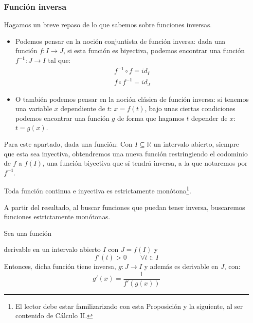 \subsubsection{Función inversa}
Hagamos un breve repaso de lo que sabemos sobre funciones inversas. 
\begin{itemize}
    \item Podemos pensar en la noción conjuntista de función inversa: dada una función $f:I\rightarrow J$, si esta función es biyectiva, podemos encontrar una función ${f^{-1}:J\rightarrow I}$ tal que:
        \begin{gather*}
            f^{-1}\circ f = id_I \\
            f\circ f^{-1} = id_J
        \end{gather*}
    \item O también podemos pensar en la noción clásica de función inversa: si tenemos una variable $x$ dependiente de $t$: $x = f(t)$, bajo unas ciertas condiciones podemos encontrar una función $g$ de forma que hagamos $t$ depender de $x$: $t = g(x)$.
\end{itemize}

Para este apartado, dada una función:
Con $I\subseteq \mathbb{R}$ un intervalo abierto, siempre que esta sea inyectiva, obtendremos una nueva función restringiendo el codominio de $f$ a $f(I)$, una función biyectiva que sí tendrá inversa, a la que notaremos por $f^{-1}$.

\begin{prop}
    Toda función continua e inyectiva es estrictamente monótona\footnote{El lector debe estar familizarizado con esta Proposición y la siguiente, al ser contenido de Cálculo II.}.
\end{prop}
A partir del resultado, al buscar funciones que puedan tener inversa, buscaremos funciones estrictamente monótonas.

\begin{prop}
    Sea una función

    derivable en un intervalo abierto $I$ con $J=f(I)$ y
    \begin{equation*}
        f'(t) > 0 \qquad \forall t\in I
    \end{equation*}
    Entonces, dicha función tiene inversa, $g:J\rightarrow I$ y además es derivable en $J$, con:
    \begin{equation*}
        g'(x) = \dfrac{1}{f'(g(x))}
    \end{equation*}
\end{prop}

